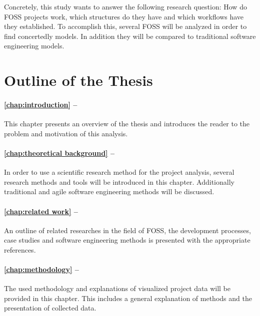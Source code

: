 Concretely, this study wants to answer the following research
question: How do \ac{FOSS} projects work, which structures do they have and
which workflows have they established. To accomplish this, several \ac{FOSS}
will be analyzed in order to find concertedly models. In addition they will be
compared to traditional software engineering models.


\section{Outline of the Thesis} %

\paragraph{\autoref{chap:introduction} -- }

This chapter presents an overview of the thesis and introduces the reader to
the problem and motivation of this analysis.

\paragraph{\autoref{chap:theoretical background} -- }

In order to use a scientific research method for the project analysis, several
research methods and tools will be introduced in this chapter. Additionally
traditional and agile software engineering methods will be discussed.

\paragraph{\autoref{chap:related work} -- }

An outline of related researches in the field of \ac{FOSS}, the development
processes, case studies and software engineering methods is presented with the
appropriate references.

\paragraph{\autoref{chap:methodology} -- }

The used methodology and explanations of visualized project data will be
provided in this chapter. This includes a general explanation of methods and
the presentation of collected data.

